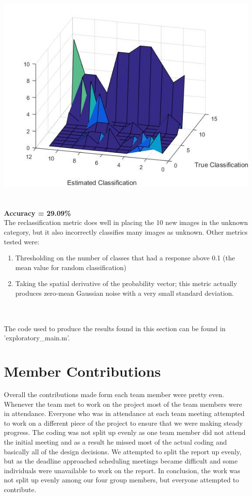 \documentclass[11pt,english]{article}
\begin{document}
\includegraphics[scale=0.6]{confexp}
~\\~\\
\textbf{Accuracy = 29.09\%}
\\
The reclassification metric does well in placing the 10 new images in the unknown category, but it also incorrectly classifies many images as unknown.  Other metrics tested were:
\begin{enumerate}
\item Thresholding on the number of classes that had a response above 0.1 (the mean value for random classification)
\item Taking the spatial derivative of the probability vector; this metric actually produces zero-mean Gaussian noise with a very small standard deviation.
\end{enumerate}

~\\~\\
The code used to produce the results found in this section can be found in 'exploratory\_main.m'.

\section{Member Contributions}
	Overall the contributions made form each team member were pretty even. Whenever the team met to work on the project most of the team members were in attendance. Everyone who was in attendance at each team meeting attempted to work on a different piece of the project to ensure that we were making steady progress. The coding was not split up evenly as one team member did not attend the initial meeting and as a result he missed most of the actual coding and basically all of the design decisions. We attempted to split the report up evenly, but as the deadline approached scheduling meetings became difficult and some individuals were unavailable to work on the report. In conclusion, the work was not split up evenly among our four group members, but everyone attempted to contribute.
\end{document}
